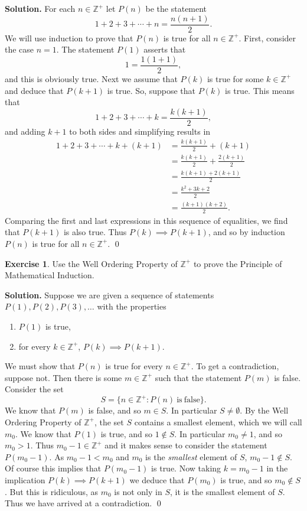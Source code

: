 \documentclass[10pt]{article}
\newcommand{\Z}{\mathbb Z}
\theoremstyle{definition}
\theoremstyle{remark}
\theoremstyle{definition}
\newtheorem{Exercise}[Thm]{Exercise}
\newenvironment{Solution}{\noindent\textbf{Solution.}}{\qed}
\begin{document}
\begin{Solution}
For each $n\in\Z^+$ let $P(n)$ be the statement 
\[
1+2+3+\cdots+ n = \frac{n(n+1)}{2}.
\]
We will use induction to prove that $P(n)$ is true for all $n\in\Z^+$.  
First, consider the case $n=1$.  The statement $P(1)$ asserts that 
\[
1=\frac{1(1+1)}{2},
\]
and this is obviously true.  Next we assume that $P(k)$ is true for some $k\in \Z^+$ and deduce that $P(k+1)$ is true.  So, 
suppose that $P(k)$ is true. This means that 
\[
1+2+3+\cdots+ k = \frac{k(k+1)}{2},
\]
and adding $k+1$ to both sides and simplifying results in
\begin{align*}
1+2+3+\cdots+ k  +(k+1) &= \frac{k(k+1)}{2} + (k+1) \\
&= \frac{k(k+1)}{2} + \frac{2(k+1)}{2} \\
&= \frac{k(k+1) + 2(k+1)}{2} \\
&= \frac{ k^2+3k+2}{2} \\
&= \frac{(k+1)(k+2)}{2}.
\end{align*}
Comparing the first and last expressions in this sequence of equalities, we find that $P(k+1)$ is also true.  
Thus $P(k)\implies P(k+1)$, and so by induction $P(n)$ is true for all $n\in \Z^+$.
\end{Solution}



\begin{Exercise}
Use the Well Ordering Property  of $\Z^+$ to prove the Principle of Mathematical Induction.
\end{Exercise}

\begin{Solution}
Suppose we are given a sequence of statements $P(1), P(2), P(3), \ldots$ with the properties
\begin{enumerate}
\item $P(1)$ is true,
\item for every $k\in \Z^+$, $P(k)\implies P(k+1)$.
\end{enumerate}
We must show that $P(n)$ is true for every $n\in \Z^+$.  To get a contradiction, suppose not.  
Then there is some $m\in \Z^+$ such that the  statement $P(m)$ is false.  Consider the set
\[
S = \{ n\in \Z^+ : P(n) \mathrm{\ is\ false} \}.
\]
We know that $P(m)$ is false, and so $m\in S$.   In particular $S\not=\emptyset$.  By the Well Ordering Property of 
$\Z^+$,  the set $S$ contains a smallest element, which we will call $m_0$.  We know that $P(1)$ is true, and so 
$1\not\in S$. In particular $m_0\not=1$, and so $m_0>1$.  Thus $m_0-1\in \Z^+$ 
and  it makes sense to consider the statement $P(m_0-1)$.  
As $m_0-1 <m_0$ and $m_0$ is the \emph{smallest} element of $S$, $m_0-1\not\in S$.  
Of course this implies that $P(m_0-1)$ is true.  Now taking $k=m_0-1$ in the implication $P(k)\implies P(k+1)$  
we deduce that $P(m_0)$ is true, and so $m_0\not\in S$.  But this is ridiculous, as $m_0$ is not only in $S$, 
it is the smallest element of $S$.  Thus we have arrived at a contradiction.
\end{Solution}

 
\end{document}
